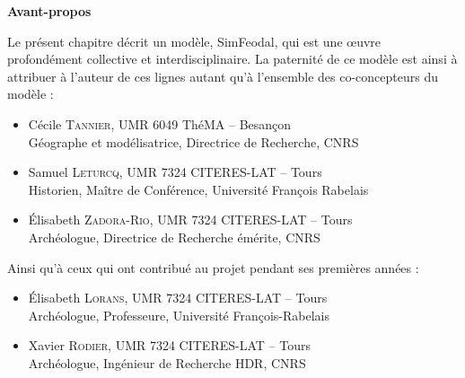 \begin{mdframed}[backgroundcolor=gray!10,footnoteinside=false]
	\textbf{Avant-propos}\vspace{-.75cm}
	\begin{multicols}{2}
Le présent chapitre décrit un modèle, SimFeodal, qui est une œuvre profondément collective et interdisciplinaire.
La paternité de ce modèle est ainsi à attribuer à l'auteur de ces lignes autant qu'à l'ensemble des co-concepteurs du modèle :
\begin{itemize}
	\item Cécile \textsc{Tannier}, UMR 6049 ThéMA -- Besançon\\
	Géographe et modélisatrice, Directrice de Recherche, CNRS
	\item Samuel \textsc{Leturcq}, UMR 7324 CITERES-LAT -- Tours\\
	Historien, Maître de Conférence, Université François Rabelais
	\item Élisabeth \textsc{Zadora-Rio}, UMR 7324 CITERES-LAT -- Tours\\
	Archéologue, Directrice de Recherche émérite, CNRS
\end{itemize}
Ainsi qu'à ceux qui ont contribué au projet pendant ses premières années :
\begin{itemize}
	\item Élisabeth \textsc{Lorans}, UMR 7324 CITERES-LAT -- Tours\\
	Archéologue, Professeure, Université François-Rabelais
	\item Xavier \textsc{Rodier}, UMR 7324 CITERES-LAT -- Tours\\
	Archéologue, Ingénieur de Recherche HDR, CNRS


\end{itemize}
\end{multicols}
\end{mdframed}
